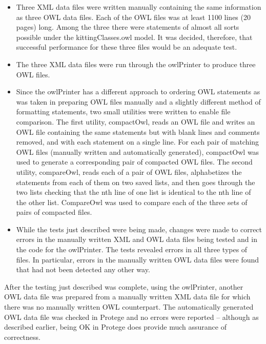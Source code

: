 \begin{itemize}
\item Three XML data files were written manually containing the same
  information as three OWL data files. Each of the OWL files was at least
  1100 lines (20 pages) long. Among the three there were statements of
  almost all sorts possible under the kittingClasses.owl model. It was
  decided, therefore, that successful performance for these three files
  would be an adequate test.
\item The three XML data files were run through the owlPrinter to produce
  three OWL files.
\item Since the owlPrinter has a different approach to ordering OWL
  statements as was taken in preparing OWL files manually and a slightly
  different method of formatting statements, two small utilities were
  written to enable file comparison. The first utility, compactOwl, reads
  an OWL file and writes an OWL file containing the same statements but
  with blank lines and comments removed, and with each statement on a
  single line. For each pair of matching OWL files (manually written and
  automatically generated), compactOwl was used to generate a corresponding
  pair of compacted OWL files. The second utility, compareOwl, reads each
  of a pair of OWL files, alphabetizes the statements from each of them on
  two saved lists, and then goes through the two lists checking that the
  nth line of one list is identical to the nth line of the other list.
  CompareOwl was used to compare each of the three sets of pairs of
  compacted files.
\item While the tests just described were being made, changes were made to
  correct errors in the manually written XML and OWL data files being
  tested and in the code for the owlPrinter. The tests revealed errors in
  all three types of files. In particular, errors in the manually written
  OWL data files were found that had not been detected any other way.
\end{itemize}

After the testing just described was complete, using the owlPrinter,
another OWL data file was prepared from a manually written XML data file
for which there was no manually written OWL counterpart. The automatically
generated OWL data file was checked in Protege and no errors were reported
-- although as described earlier, being OK in Protege does provide much
assurance of correctness.

